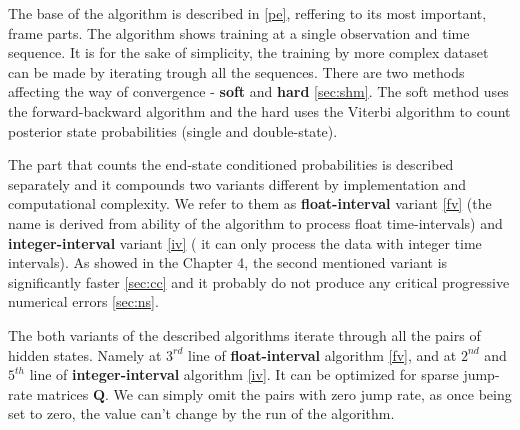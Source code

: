 \documentclass[thesis=M,english]{FITthesis}[2012/10/20]
\newcommand{\matr}[1]{\mathbf{#1}}
\begin{document}
The base of the algorithm is described in \ref{pe}, reffering to its most important, frame parts. The algorithm shows training at a single observation and time sequence. 
It is for the sake of simplicity, the training by more complex dataset can be made by iterating trough all the sequences. 
There are two methods affecting the way of convergence - \textbf{soft} and \textbf{hard} \ref{sec:shm}. 
The soft method uses the forward-backward algorithm and the hard uses the Viterbi algorithm to count posterior state probabilities (single and double-state).

The part that counts the end-state conditioned probabilities is described separately and it compounds two variants different by implementation and computational complexity. We refer to them as \textbf{float-interval} variant \ref{fv} (the name is derived from ability of the algorithm to process float time-intervals) and \textbf{integer-interval} variant \ref{iv} ( it can only process the data with integer time intervals). As showed in the Chapter 4, the second mentioned variant is significantly faster \ref{sec:cc} and it probably do not produce any critical progressive numerical errors \ref{sec:ns}.

The both variants of the described algorithms iterate through all the pairs of hidden states. Namely at $3^{rd}$ line of \textbf{float-interval} algorithm \ref{fv}, and at $2^{nd}$ and $5^{th}$ line of \textbf{integer-interval} algorithm \ref{iv}. It can be optimized for sparse jump-rate matrices $\matr{Q}$. We can simply omit the pairs with zero jump rate, as once being set to zero, the value can't change by the run of the algorithm.       
\end{document}
